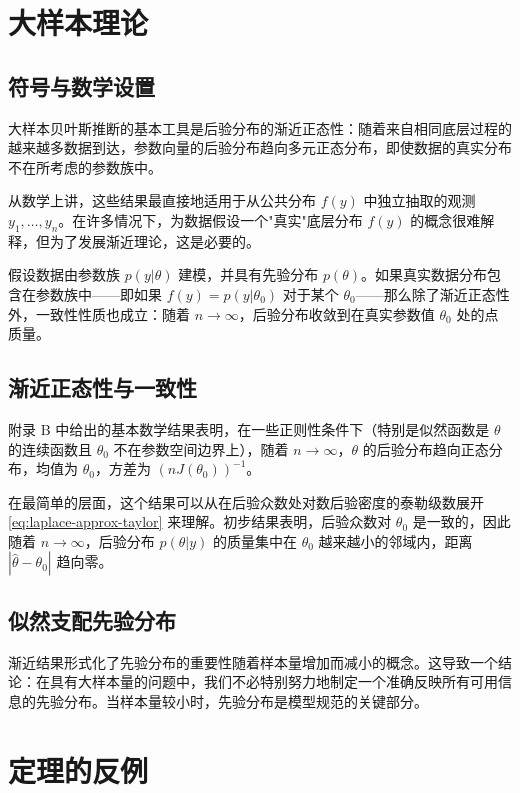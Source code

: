 \section{大样本理论}\label{sec:large-sample-theory}

\subsection{符号与数学设置}

大样本贝叶斯推断的基本工具是后验分布的渐近正态性：随着来自相同底层过程的越来越多数据到达，参数向量的后验分布趋向多元正态分布，即使数据的真实分布不在所考虑的参数族中。

从数学上讲，这些结果最直接地适用于从公共分布 $f(y)$ 中独立抽取的观测 $y_1, \ldots, y_n$。在许多情况下，为数据假设一个"真实"底层分布 $f(y)$ 的概念很难解释，但为了发展渐近理论，这是必要的。

假设数据由参数族 $p(y|\theta)$ 建模，并具有先验分布 $p(\theta)$。如果真实数据分布包含在参数族中——即如果 $f(y) = p(y|\theta_0)$ 对于某个 $\theta_0$——那么除了渐近正态性外，一致性性质也成立：随着 $n \to \infty$，后验分布收敛到在真实参数值 $\theta_0$ 处的点质量。

\subsection{渐近正态性与一致性}

附录 B 中给出的基本数学结果表明，在一些正则性条件下（特别是似然函数是 $\theta$ 的连续函数且 $\theta_0$ 不在参数空间边界上），随着 $n \to \infty$，$\theta$ 的后验分布趋向正态分布，均值为 $\theta_0$，方差为 $(nJ(\theta_0))^{-1}$。

在最简单的层面，这个结果可以从在后验众数处对数后验密度的泰勒级数展开 \cref{eq:laplace-approx-taylor} 来理解。初步结果表明，后验众数对 $\theta_0$ 是一致的，因此随着 $n \to \infty$，后验分布 $p(\theta | y)$ 的质量集中在 $\theta_0$ 越来越小的邻域内，距离 $|\hat{\theta} - \theta_0|$ 趋向零。

\subsection{似然支配先验分布}

渐近结果形式化了先验分布的重要性随着样本量增加而减小的概念。这导致一个结论：在具有大样本量的问题中，我们不必特别努力地制定一个准确反映所有可用信息的先验分布。当样本量较小时，先验分布是模型规范的关键部分。

\section{定理的反例}

